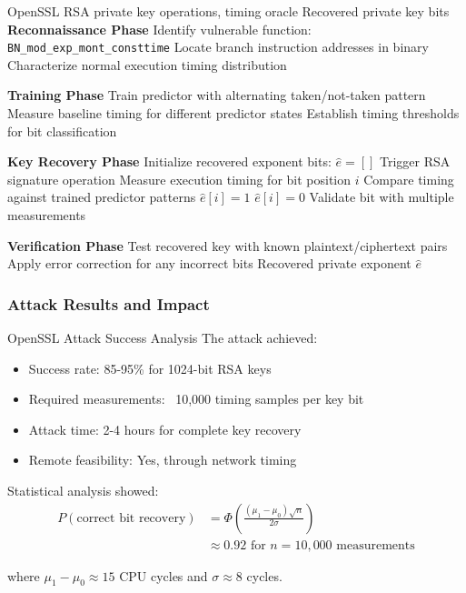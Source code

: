 \documentclass[11pt,a4paper]{article}
\theoremstyle{definition}
\begin{document}
\begin{algorithm}
\caption{OpenSSL RSA Branch Prediction Attack}
\begin{algorithmic}[1]
\REQUIRE OpenSSL RSA private key operations, timing oracle
\ENSURE Recovered private key bits
\STATE \textbf{Reconnaissance Phase}
\STATE Identify vulnerable function: \texttt{BN\_mod\_exp\_mont\_consttime}
\STATE Locate branch instruction addresses in binary
\STATE Characterize normal execution timing distribution

\STATE \textbf{Training Phase}
    \STATE Train predictor with alternating taken/not-taken pattern
    \STATE Measure baseline timing for different predictor states
    \STATE Establish timing thresholds for bit classification
\ENDFOR

\STATE \textbf{Key Recovery Phase}
\STATE Initialize recovered exponent bits: $\hat{e} = []$
    \STATE Trigger RSA signature operation
    \STATE Measure execution timing for bit position $i$
    \STATE Compare timing against trained predictor patterns
        \STATE $\hat{e}[i] = 1$
    \ELSE
        \STATE $\hat{e}[i] = 0$
    \ENDIF
    \STATE Validate bit with multiple measurements
\ENDFOR

\STATE \textbf{Verification Phase}
\STATE Test recovered key with known plaintext/ciphertext pairs
\STATE Apply error correction for any incorrect bits
\RETURN Recovered private exponent $\hat{e}$
\end{algorithmic}
\end{algorithm}

\subsubsection{Attack Results and Impact}

\begin{mathematicsbox}{OpenSSL Attack Success Analysis}
The attack achieved:
\begin{itemize}
    \item Success rate: 85-95\% for 1024-bit RSA keys
    \item Required measurements: ~10,000 timing samples per key bit
    \item Attack time: 2-4 hours for complete key recovery
    \item Remote feasibility: Yes, through network timing
\end{itemize}

Statistical analysis showed:
\begin{align}
P(\text{correct bit recovery}) &= \Phi\left(\frac{(\mu_1 - \mu_0)\sqrt{n}}{2\sigma}\right) \\
&\approx 0.92 \text{ for } n = 10,000 \text{ measurements}
\end{align}

where $\mu_1 - \mu_0 \approx 15$ CPU cycles and $\sigma \approx 8$ cycles.
\end{mathematicsbox}
\end{document}
